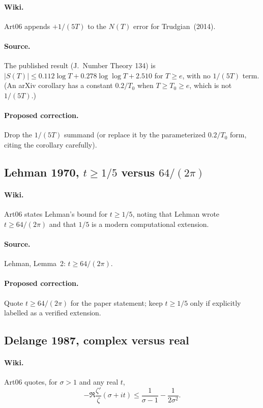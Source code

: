 \documentclass[11pt,a4paper]{article}
\begin{document}
\paragraph{Wiki.}
Art06 appends $+1/(5T)$ to the $N(T)$ error for Trudgian~(2014).
\paragraph{Source.}
The published result (J.\ Number Theory 134) is
$|S(T)|\le 0.112\log T+0.278\log\log T+2.510$ for $T\ge e$, with no
$1/(5T)$ term.  (An arXiv corollary has a constant $0.2/T_0$ when
$T\ge T_0\ge e$, which is not $1/(5T)$.)
\paragraph{Proposed correction.}
Drop the $1/(5T)$ summand (or replace it by the parameterized
$0.2/T_0$ form, citing the corollary carefully).

\subsection{Lehman 1970, $t\ge 1/5$ versus $64/(2\pi)$}
\label{err:lehman-threshold}
\paragraph{Wiki.}
Art06 states Lehman's bound for $t\ge 1/5$, noting that Lehman wrote
$t\ge 64/(2\pi)$ and that $1/5$ is a modern computational extension.
\paragraph{Source.}
Lehman, Lemma~2: $t\ge 64/(2\pi)$.
\paragraph{Proposed correction.}
Quote $t\ge 64/(2\pi)$ for the paper statement; keep $t\ge 1/5$ only if
explicitly labelled as a verified extension.

\subsection{Delange 1987, complex versus real}
\label{err:delange-real}
\paragraph{Wiki.}
Art06 quotes, for $\sigma>1$ and any real $t$,
\[
-\Re\frac{\zeta'}{\zeta}(\sigma+it)
\le \frac1{\sigma-1}-\frac1{2\sigma^2}.
\]
\end{document}
